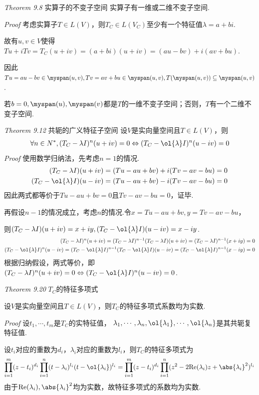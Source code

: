 \textit{Theorem 9.8} {\kaishu 实算子的不变子空间}
实算子有一维或二维不变子空间.

\textit{Proof}
考虑实算子\(T \in L(V)\)，则\(T_C \in L(V_C)\)至少有一个特征值\(\lambda=a+bi\).

故有\(u,v \in V\)使得\(Tu+iTv=T_C(u+iv)=(a+bi)(u+iv)=(au-bv)+i(av+bu)\).

因此\(Tu=au-bv \in \myspan(u,v),Tv=av+bu \in \myspan(u,v),T(\myspan(u,v)) \subseteq \myspan(u,v)\).

若\(b=0,\myspan(u),\myspan(v)\)都是\(T\)的一维不变子空间；否则，\(T\)有一个二维不变子空间.

\hspace*{\fill}

\textit{Theorem 9.12} {\kaishu 共轭的广义特征子空间}
设\(V\)是实向量空间且\(T \in L(V)\)，则
    \begin{align*}
        \forall n \in N^*,(T_C-\lambda I)^n (u+iv)=0 \Leftrightarrow (T_C-\ol{\lambda} I)^n (u-iv)=0
    \end{align*}
\textit{Proof}
使用数学归纳法，先考虑\(n=1\)的情况.
    \begin{align*}
        (T_C-\lambda I)(u+iv)=(Tu-au+bv)+i(Tv-av-bu)=0 \\
        (T_C-\ol{\lambda} I)(u-iv)=(Tu-au+bv)-i(Tv-av-bu)=0
    \end{align*}
因此两式都等价于\(Tu-au+bv=0\)且\(Tv-av-bu=0\)，证毕.

再假设\(n-1\)的情况成立，考虑\(n\)的情况.令\(x=Tu-au+bv,y=Tv-av-bu\)，

则\((T_C-\lambda I)(u+iv)=x+iy,(T_C-\ol{\lambda} I)(u-iv)=x-iy\).
    \begin{align*}
        (T_C-\lambda I)^n (u+iv)=(T_C-\lambda I)^{n-1}(T_C-\lambda I)(u+iv)
        =(T_C-\lambda I)^{n-1}(x+iy)=0 \\
        (T_C-\ol{\lambda} I)^n (u-iv)=(T_C-\ol{\lambda} I)^{n-1}(T_C-\ol{\lambda}I)(u-iv)
        =(T_C-\ol{\lambda} I)^{n-1}(x-iy)=0    
    \end{align*}
根据归纳假设，两式等价，即\((T_C-\lambda I)^n (u+iv)=0 \Leftrightarrow (T_C-\ol{\lambda} I)^n (u-iv)=0\).

\hspace*{\fill}

\textit{Theorem 9.20} \(T_C\){\kaishu 的特征多项式}

设\(V\)是实向量空间且\(T \in L(V)\)，则\(T_C\)的特征多项式系数均为实数.

\textit{Proof}
设\(t_1,\cdots,t_m\)是\(T_C\)的实特征值，
\(\lambda_1,\cdots,\lambda_n,\ol{\lambda_1},\cdots,\ol{\lambda_n}\)是其共轭复特征值.

设\(t_i\)对应的重数为\(d_i\)，\(\lambda_i\)对应的重数为\(l_i\)，则\(T_C\)的特征多项式为
    \begin{align*}
        \prod_{i=1}^m (z-t_i)^{d_i} \prod_{i=1}^n (t-\lambda_i)^{l_i}(t-\ol{\lambda_i})^{l_i}
        =\prod_{i=1}^m (z-t_i)^{d_i} \prod_{i=1}^n (z^2-2\mathrm{Re}(\lambda_i)z+\abs{\lambda_i}^2)^{l_i}
    \end{align*}
由于\(\mathrm{Re}(\lambda_i),\abs{\lambda_i}^2\)均为实数，故特征多项式的系数均为实数.

